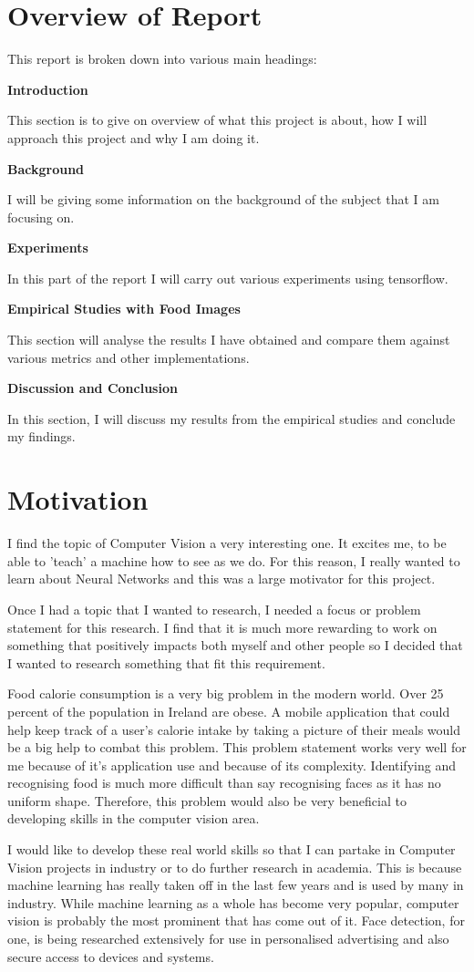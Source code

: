 \section{Overview of Report}

This report is broken down into various main headings:

\textbf{Introduction}

This section is to give on overview of what this project is about, how I will approach this project and why I am doing it.

\textbf{Background}

I will be giving some information on the background of the subject that I am focusing on.

\textbf{Experiments}

In this part of the report I will carry out various experiments using
tensorflow.

\textbf{Empirical Studies with Food Images}

This section will analyse the results I have obtained and compare them against various metrics and other implementations.

\textbf{Discussion and Conclusion}

In this section, I will discuss my results from the empirical studies and conclude my findings.


\section{Motivation}
I find the topic of Computer Vision a very interesting one.
It excites me, to be able to 'teach' a machine how to see as we do.
For this reason, I really wanted to learn about Neural Networks
and this was a large motivator for this project.

Once I had a topic that I wanted to research, I needed a focus or problem statement for this research.
I find that it is much more rewarding to work on something that positively
impacts both myself and other people so I decided that I wanted to research
something that fit this requirement.

Food calorie consumption is a very big problem in the modern world.
Over 25 percent of the population in Ireland are obese.
A mobile application that could help keep track of a user's calorie intake by taking a picture of their meals would be a big help to combat this problem.
This problem statement works very well for me because of it's application use and because of its complexity.
Identifying and recognising food is much more difficult than say recognising faces as it has no uniform shape.
Therefore, this problem would also be very beneficial to developing skills in the computer vision area.

I would like to develop these real world skills so that I can partake in
Computer Vision projects in industry or to do further research in academia. This
is because machine learning has really taken off in the last few years and is
used by many in industry. While machine learning as a whole has become very
popular, computer vision is probably the most prominent that has come out of it.
Face detection, for one, is being researched extensively for use in personalised
advertising and also secure access to devices and systems.
